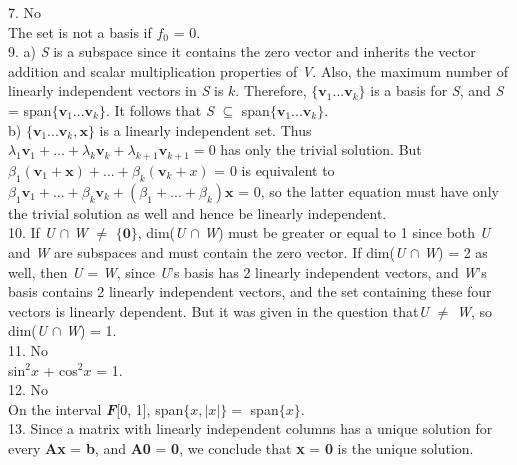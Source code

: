 \documentclass{article}
\begin{document}
    7. No\\
    The set is not a basis if $f_0$ = 0.\\

    9. a) \textit{S} is a subspace since it contains the zero vector and inherits the vector addition and scalar multiplication properties of \textit{V}. Also, the maximum number of linearly independent vectors in \textit{S} is $k$. Therefore, $\{\textbf{v}_1 ... \textbf{v}_k\}$ is a basis for \textit{S}, and \textit{S} = span$\{\textbf{v}_1 ... \textbf{v}_k\}$. It follows that \textit{S} $\subseteq$ span$\{\textbf{v}_1 ... \textbf{v}_k\}$.\\
    b) $\{\textbf{v}_1 ... \textbf{v}_k, \textbf{x}\}$ is a linearly independent set. Thus $\lambda_1\textbf{v}_1 + ... + \lambda_k\textbf{v}_k + \lambda_{k+1}\textbf{v}_{k+1} = 0$ has only the trivial solution. But $\beta_1(\textbf{v}_1 + \textbf{x}) + ... + \beta_k(\textbf{v}_k + x)$ = 0 is equivalent to $\beta_1\textbf{v}_1 + ... + \beta_k\textbf{v}_k + (\beta_1 + ... + \beta_k)\textbf{x}$ = 0, so the latter equation must have only the trivial solution as well and hence be linearly independent.\\

    10. If \textit{U} $\cap$ \textit{W} $\neq$ $\{\textbf{0}\}$, dim(\textit{U} $\cap$ \textit{W}) must be greater or equal to 1 since both \textit{U} and \textit{W} are subspaces and must contain the zero vector. If dim(\textit{U} $\cap$ \textit{W}) = 2 as well, then \textit{U} = \textit{W}, since \textit{U}'s basis has 2 linearly independent vectors, and \textit{W}'s basis contains 2 linearly independent vectors, and the set containing these four vectors is linearly dependent. But it was given in the question that\textit{U} $\neq$ \textit{W}, so dim(\textit{U} $\cap$ \textit{W}) = 1.\\

    11. No\\
    sin$^2x$ + cos$^2x$ = 1.\\

    12. No\\
    On the interval \textbf{\textit{F}}[0, 1], span$\{x, |x|\} =$ span$\{x\}$.\\

    13. Since a matrix with linearly independent columns has a unique solution for every \textbf{Ax} = \textbf{b}, and \textbf{A}\textbf{0} = \textbf{0}, we conclude that \textbf{x} = \textbf{0} is the unique solution.\\
\end{document}
